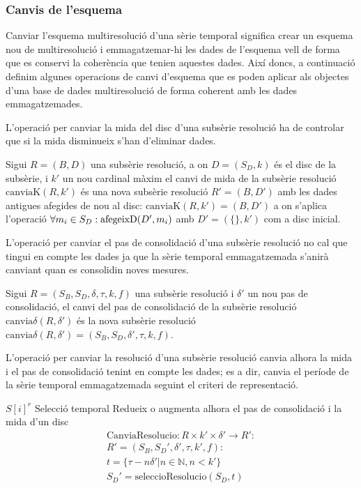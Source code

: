 \subsubsection{Canvis de l'esquema}

Canviar l'esquema multiresolució d'una sèrie temporal significa crear
un esquema nou de multiresolució i emmagatzemar-hi les dades de
l'esquema vell de forma que es conservi la coherència que tenien
aquestes dades. Així doncs, a continuació definim algunes operacions
de canvi d'esquema que es poden aplicar als objectes d'una base de
dades multiresolució de forma coherent amb les dades emmagatzemades.


L'operació per canviar la mida del disc d'una subsèrie resolució ha de
controlar que si la mida disminueix s'han d'eliminar dades.
\begin{definition}
  Sigui $R=(B,D)$ una subsèrie resolució, a on $D=(S_D,k)$ és el disc
  de la subsèrie, i $k'$ un nou cardinal màxim el canvi de mida de la
  subsèrie resolució $\text{canviaK}(R,k')$ és una nova subsèrie
  resolució $R'=(B,D')$ amb les dades antigues afegides de nou al
  disc: $\text{canviaK}(R,k')= (B,D')$ a on s'aplica l'operació
  $\forall m_i \in S_D: \operatorname*{afegeixD}(D',m_i)$ amb $D'=(\{\},k')$ com a disc
  inicial.
\end{definition}


L'operació per canviar el pas de consolidació d'una subsèrie resolució
no cal que tingui en compte les dades ja que la sèrie temporal
emmagatzemada s'anirà canviant quan es consolidin noves mesures.
\begin{definition}
  Sigui $R = (S_B,S_D,\delta,\tau,k,f)$ una subsèrie resolució i
  $\delta'$ un nou pas de consolidació, el canvi del pas de
  consolidació de la subsèrie resolució
  $\text{canvia}\delta(R,\delta')$ és la nova subsèrie resolució
  $\text{canvia}\delta(R,\delta')=(S_B,S_D,\delta',\tau,k,f)$.
\end{definition}

L'operació per canviar la resolució d'una subsèrie resolució canvia
alhora la mida i el pas de consolidació tenint en compte les dades; es
a dir, canvia el període de la sèrie temporal emmagatzemada seguint el
criteri de representació.

$S[i]^r$ Selecció temporal
\todo{}
Redueix o augmenta alhora el pas de consolidació i la mida d'un disc
  \begin{gather*}
    \text{CanviaResolucio}: R \times k' \times \delta' \longrightarrow R': \\
    R' = (S_B,S_D',\delta',\tau,k',f): \\    
    t = \{ \tau-n\delta' | n\in\mathbb{N},n<k' \} \\
    S_D' = \text{seleccioResolucio}(S_D,t)
  \end{gather*}




